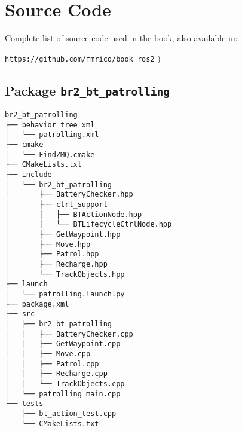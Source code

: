 \appendix

\chapter[Source Code]{Source Code}
\label{cap:source}
Complete list of source code used in the book, also available in:

\vspace{0.5cm}
\large
\texttt{https://github.com/fmrico/book\_ros2}
\normalsize
)
\section{Package \texttt{br2\_bt\_patrolling}}
\label{sec:anex:br2_bt_patrolling}

 \footnotesize
\begin{tcolorbox}[sharp corners, colframe=gray!80, colback=LightGray, left=0pt, top=0pt, bottom=0pt, title=Package \texttt{br2\_bt\_patrolling}]
  \begin{verbatim}
br2_bt_patrolling
├── behavior_tree_xml
│   └── patrolling.xml
├── cmake
│   └── FindZMQ.cmake
├── CMakeLists.txt
├── include
│   └── br2_bt_patrolling
│       ├── BatteryChecker.hpp
│       ├── ctrl_support
│       │   ├── BTActionNode.hpp
│       │   └── BTLifecycleCtrlNode.hpp
│       ├── GetWaypoint.hpp
│       ├── Move.hpp
│       ├── Patrol.hpp
│       ├── Recharge.hpp
│       └── TrackObjects.hpp
├── launch
│   └── patrolling.launch.py
├── package.xml
├── src
│   ├── br2_bt_patrolling
│   │   ├── BatteryChecker.cpp
│   │   ├── GetWaypoint.cpp
│   │   ├── Move.cpp
│   │   ├── Patrol.cpp
│   │   ├── Recharge.cpp
│   │   └── TrackObjects.cpp
│   └── patrolling_main.cpp
└── tests
    ├── bt_action_test.cpp
    └── CMakeLists.txt    \end{verbatim}
    \end{tcolorbox}
  \normalsize


